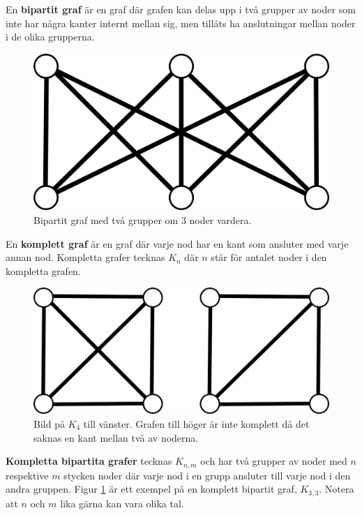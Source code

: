 \documentclass[a4paper,11pt]{article}
\begin{document}
En \textbf{bipartit graf} är en graf där grafen kan delas upp i två grupper av noder som inte har några kanter internt mellan sig, men tillåts ha anslutningar mellan noder i de olika grupperna.

\begin{figure}[!ht]
	\begin{center}
		\includegraphics{fig2}
		\caption{Bipartit graf med två grupper om 3 noder vardera.}
		\label{fig2}
	\end{center}
\end{figure}
\FloatBarrier

En \textbf{komplett graf} är en graf där varje nod har en kant som ansluter med varje annan nod. Kompletta grafer tecknas $K_n$ där $n$ står för antalet noder i den kompletta grafen.

\begin{figure}[!ht]
	\begin{center}
		\includegraphics{fig3}
		\caption{Bild på $K_4$ till vänster. Grafen till höger är inte komplett då det saknas en kant mellan två av noderna.}
		\label{fig3}
	\end{center}
\end{figure}
\FloatBarrier

\textbf{Kompletta bipartita grafer} tecknas $K_{n,m}$ och har två grupper av noder med $n$ respektive $m$ stycken noder där varje nod i en grupp ansluter till varje nod i den andra gruppen. Figur \ref{fig2} är ett exempel på en komplett bipartit graf, $K_{3,3}$. Notera att $n$ och $m$ lika gärna kan vara olika tal.
\end{document}
